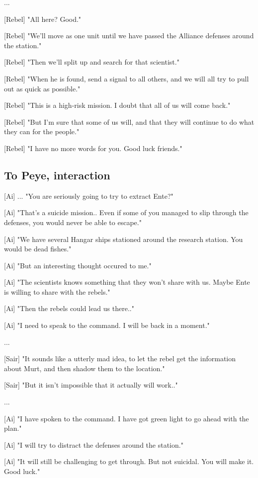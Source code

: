 \documentclass[a4paper,12pt]{article}
\begin{document}
...

[Rebel] "All here? Good." 

[Rebel] "We'll move as one unit until we have passed the Alliance defenses around the station."

[Rebel] "Then we'll split up and search for that scientist." 

[Rebel] "When he is found, send a signal to all others, and we will all try to pull out as quick as possible."

[Rebel] "This is a high-risk mission. I doubt that all of us will come back."

[Rebel] "But I'm sure that some of us will, and that they will continue to do what they can for the people."

[Rebel] "I have no more words for you. Good luck friends."

\subsection{To Peye, interaction}

[Ai] ... "You are seriously going to try to extract Ente?" 

[Ai] "That's a suicide mission.. Even if some of you managed to slip through
the defenses, you would never be able to escape." 

[Ai] "We have several Hangar ships stationed around the research station. You would be dead fishes."

[Ai] "But an interesting thought occured to me." 

[Ai] "The scientists knows something that they won't share with us. Maybe Ente is willing to share with the rebels."

[Ai] "Then the rebels could lead us there.."

[Ai] "I need to speak to the command. I will be back in a moment."

...

[Sair] "It sounds like a utterly mad idea, to let the rebel get the information about Murt, and then shadow them to
the location."

[Sair] "But it isn't impossible that it actually will work.."

...

[Ai] "I have spoken to the command. I have got green light to go ahead with the plan."

[Ai] "I will try to distract the defenses around the station."

[Ai] "It will still be challenging to get through. But not suicidal. You will make it. Good luck."
\end{document}
